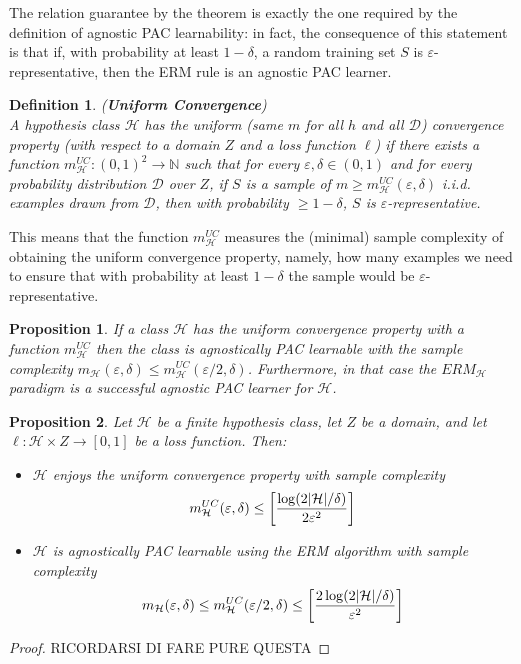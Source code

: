 \documentclass[12pt]{report}
\theoremstyle{plain}
\newtheorem{DEF}{Definition}
\newtheorem{PROP}{Proposition}
\newcommand\mcl[1]{\mathcal{#1}}
\begin{document}
\begin{flushleft}
The relation guarantee by the theorem is exactly the one required by the definition of agnostic PAC learnability: in fact, the consequence of this statement is that if, with probability at least $1-\delta$, a random training set $S$ is $\varepsilon$-representative, then the ERM rule is an agnostic PAC learner.

\begin{DEF} (\textbf{Uniform Convergence})\\
	A hypothesis class $\mcl{H}$ has the uniform (same $m$ for all $h$ and all $\mcl{D}$) convergence property (with respect to a domain $Z$ and a loss function $\ell$) if there exists a function $m_\mcl{H}^{UC}:(0,1)^2\to\mathds{N}$ such that for every $\varepsilon,\delta\in(0,1)$ and for every probability distribution $\mcl{D}$ over $Z$, if $S$ is a sample of $m\geq m_\mcl{H}^{UC}(\varepsilon,\delta)$ i.i.d. examples drawn from $\mcl{D}$, then with probability $\geq 1-\delta$, $S$ is $\varepsilon$-representative.
\end{DEF} 

This means that the function $m_\mcl{H}^{UC}$ measures the (minimal) sample complexity of obtaining the uniform convergence property, namely, how many examples we need to ensure that with probability at least $1-\delta$ the sample would be $\varepsilon$-representative.

\begin{PROP}
	If a class $\mcl{H}$ has the uniform convergence property with a function $m_\mcl{H}^{UC}$ then the class is agnostically PAC learnable with the sample complexity $m_\mcl{H}(\varepsilon,\delta)\leq m_\mcl{H}^{UC}(\varepsilon/2,\delta)$. Furthermore, in that case the $ERM_\mcl{H}$ paradigm is a successful agnostic PAC learner for $\mcl{H}$.	
\end{PROP}

\begin{PROP}
	Let $\mcl{H}$ be a finite hypothesis class, let $Z$ be a domain, and let $\ell:\mcl{H}\times Z\to[0,1]$ be a loss function. Then:
	\begin{itemize}
		\item $\mcl{H}$ enjoys the uniform convergence property with sample complexity 
		\[ m_\mcl{H}^{UC}(\varepsilon,\delta)\leq\left[\frac{\log(2\abs{\mcl{H}}/\delta)}{2\varepsilon^2}\right] \]
	\item $\mcl{H}$ is agnostically PAC learnable using the ERM algorithm with sample complexity
	\[ m_\mcl{H}(\varepsilon,\delta)\leq m_\mcl{H}^{UC}(\varepsilon/2,\delta)\leq\left[\frac{2\log(2\abs{\mcl{H}}/\delta)}{\varepsilon^2}\right] \]
	\end{itemize}
\end{PROP}
\begin{proof}
	RICORDARSI DI FARE PURE QUESTA 
\end{proof}


\end{flushleft}
\end{document}
